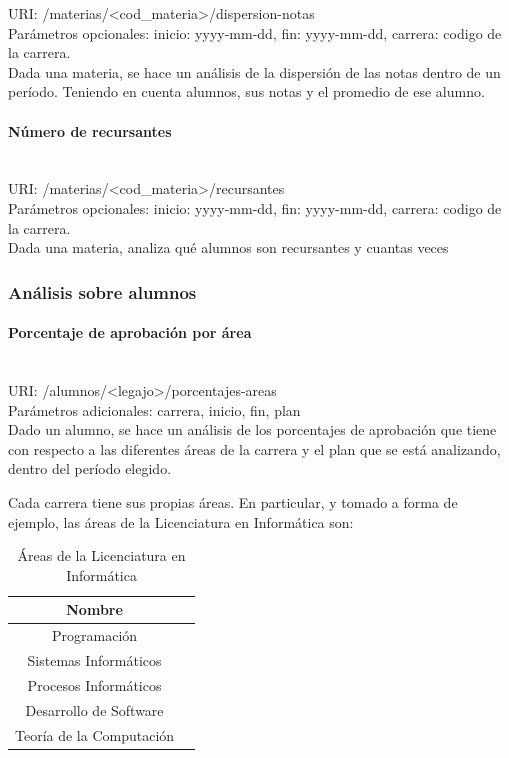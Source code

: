 URI: /materias/<cod\_materia>/dispersion-notas \\
Parámetros opcionales: inicio: yyyy-mm-dd, fin: yyyy-mm-dd, carrera: codigo de la carrera. \\
Dada una materia, se hace un análisis de la dispersión de las notas dentro de un período. Teniendo en cuenta alumnos, sus notas y el promedio de ese alumno.

\paragraph{Número de recursantes}\mbox{}\\
URI: /materias/<cod\_materia>/recursantes \\
Parámetros opcionales: inicio: yyyy-mm-dd, fin: yyyy-mm-dd, carrera: codigo de la carrera. \\
Dada una materia, analiza qué alumnos son recursantes y cuantas veces


\subsubsection{Análisis sobre alumnos}

\paragraph{Porcentaje de aprobación por área}\mbox{}\\

URI: /alumnos/<legajo>/porcentajes-areas \\

Parámetros adicionales: carrera, inicio, fin, plan \\

Dado un alumno, se hace un análisis de los porcentajes de aprobación que tiene con respecto a las diferentes áreas de la carrera y el plan que se está analizando, dentro del período elegido.

Cada carrera tiene sus propias áreas. En particular, y tomado a forma de ejemplo, las áreas de la Licenciatura en Informática son:

\begin{table}[!htbp]
    \centering
    \makegapedcells
    \begin{tabular}{|c|c|}
    \hline
    Nombre \\ \hline
    Programación \\ \hline
    Sistemas Informáticos \\ \hline
    Procesos Informáticos\\ \hline
    Desarrollo de Software \\ \hline
    Teoría de la Computación \\ \hline
    \end{tabular}
    \caption{Áreas de la Licenciatura en Informática}
    \label{tab:tabla_areas}
\end{table}

